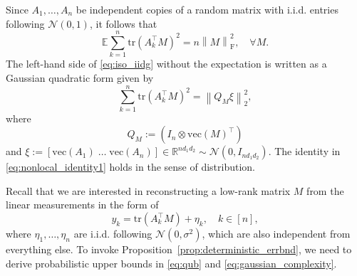 \documentclass[11pt]{article}
\newcommand{\norm}[1]{\left \|#1 \right \|}
\newcommand{\E}{\mathbb{E}}
\begin{document}
Since $A_1,\dots,A_n$ be independent copies of a random matrix with i.i.d. entries following $\mathcal{N}(0,1)$, it follows that 
\begin{equation}
\label{eq:iso_iidg}
\E \sum_{k=1}^n \mathrm{tr}(A_k^\top M)^2 = n \norm{M}_\mathrm{F}^2, \quad \forall M.
\end{equation}
The left-hand side of \eqref{eq:iso_iidg} without the expectation is written as a Gaussian quadratic form given by
\begin{equation}
\label{eq:nonlocal_identity1}
\sum_{k=1}^n \mathrm{tr}(A_k^\top M)^2 = 
\norm{Q_M \xi}_2^2,
\end{equation}
where
\begin{equation*}
Q_{M} := \left( I_n \otimes \mathrm{vec}(M)^\top \right)
\end{equation*} 
and $\xi := [\mathrm{vec}(A_1)\; \dots \; \mathrm{vec}(A_n)] \in \mathbb{R}^{nd_1d_2} \sim \mathcal{N}(0,I_{nd_1d_2})$. 
The identity in \eqref{eq:nonlocal_identity1} holds in the sense of distribution.

Recall that we are interested in reconstructing a low-rank matrix $M$ from the linear measurements in the form of
\[
y_k = \mathrm{tr}(A_k^\top M) + \eta_k, \quad k \in [n], 
\]
where $\eta_1, \dots, \eta_n$ are i.i.d. following $\mathcal{N}(0,\sigma^2)$, which are also independent from everything else. 
To invoke Proposition~\ref{prop:deterministic_errbnd}, we need to derive probabilistic upper bounds in \eqref{eq:qub} and \eqref{eq:gaussian_complexity}. 
\end{document}
